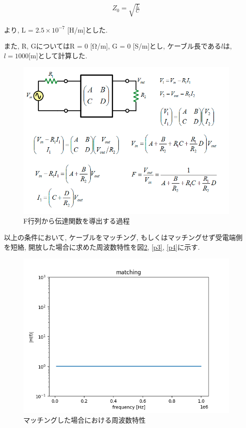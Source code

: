 \documentclass[a4j,12pt,]{jarticle}
\begin{document}
\large
\begin{eqnarray}
  Z_0 =  \sqrt{\frac{L}{C}}
\end{eqnarray}
\normalsize

より, L = $2.5 × 10^{-7}$ [H/m]とした.

また, R, GについてはR = 0 [Ω/m], G = 0 [S/m]とし, ケーブル長である$l$は, $l = 1000$[m]として計算した.

\begin{figure}[H]
  \begin{center}
    \includegraphics[width=140mm]{transfer.png}
    \caption{F行列から伝達関数を導出する過程}
    \label{p1}
  \end{center}
\end{figure}

以上の条件において, ケーブルをマッチング, もしくはマッチングせず受電端側を短絡, 開放した場合に求めた周波数特性を図\ref{p2}, \ref{p3}, \ref{p4}に示す.

\begin{figure}[H]
  \begin{center}
    \includegraphics[width=160mm]{matching.png}
    \caption{マッチングした場合における周波数特性}
    \label{p2}
  \end{center}
\end{figure}
\end{document}

